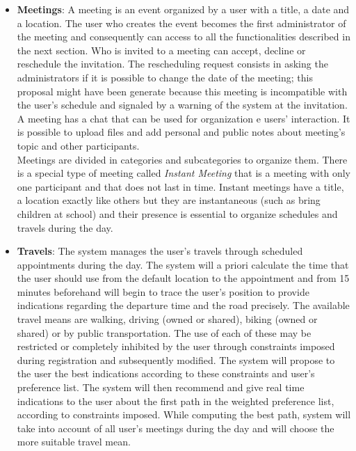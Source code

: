 \begin{itemize}
	\item \textbf{{Meetings}}: A meeting is an event organized by a user with a title, a date and a location. The user who creates the event becomes the first administrator of the meeting and consequently can access to all the functionalities described in the next section. Who is invited to a meeting can accept, decline or reschedule the invitation. The rescheduling request consists in asking the administrators if it is possible to change the date of the meeting; this proposal might have been generate because this meeting is incompatible with the user's schedule and signaled by a warning of the system at the invitation. \\
	A meeting has a chat that can be used for organization e users' interaction. It is possible to upload files and add personal and public notes about meeting's topic and other participants.\\
	Meetings are divided in categories and subcategories to organize them. There is a special type of meeting called \textit{Instant Meeting }that is a meeting with only one participant and that does not last in time. Instant meetings have a title, a location exactly like others but they are instantaneous (such as bring children at school) and their presence is essential to organize schedules and travels during the day.
		
	\item \textbf{{Travels}}: The system manages the user's travels through scheduled appointments during the day. The system will a priori calculate the time that the user should use from the default location to the appointment and from 15 minutes beforehand will begin to trace the user's position to provide indications regarding the departure time and the road precisely. The available travel means are walking, driving (owned or shared), biking (owned or shared) or by public transportation.  The use of each of these may be restricted or completely inhibited by the user through constraints imposed during registration and subsequently modified. The system will propose to the user the best indications according to these constraints and user's preference list. The system will then recommend and give real time indications to the user about the first path in the weighted preference list, according to constraints imposed. While computing the best path, system will take into account of all user's meetings during the day and will choose the more suitable travel mean.
\end{itemize}